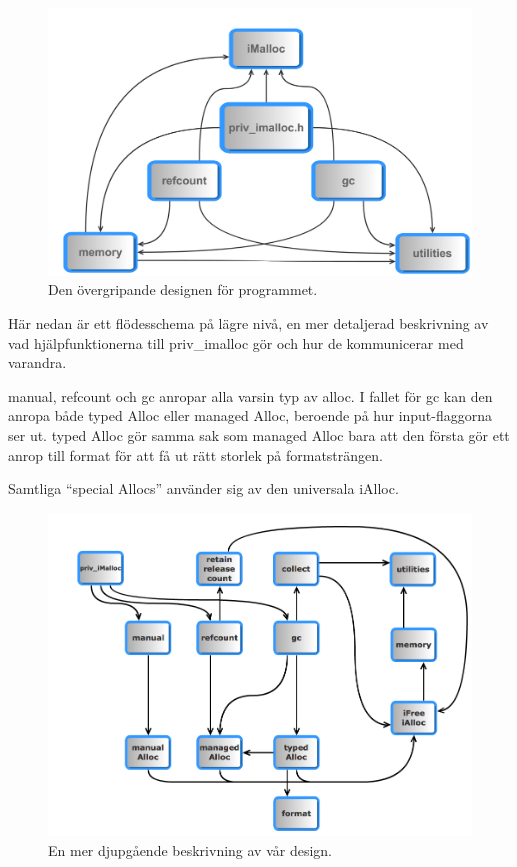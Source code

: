 \begin{figure}[H]
  \includegraphics[width=\columnwidth]{images/design_overview.png}
  \caption{Den övergripande designen för programmet.}
  \label{fig:design_overview}
\end{figure}



Här nedan är ett flödesschema på lägre nivå, en mer detaljerad beskrivning av vad hjälpfunktionerna till priv\_imalloc gör och hur de kommunicerar med varandra.

manual, refcount och gc anropar alla varsin typ av alloc. I fallet för gc kan den anropa både typed Alloc eller managed Alloc, beroende på hur input-flaggorna ser ut. typed Alloc gör samma sak som managed Alloc bara att den första gör ett anrop till format för att få ut rätt storlek på formatsträngen.

Samtliga “special Allocs” använder sig av den universala iAlloc.


\begin{figure}[H]
  \includegraphics[width=\columnwidth]{images/design_depth.png}
  \caption{En mer djupgående beskrivning av vår design.}
  \label{fig:design_depth}
\end{figure}

